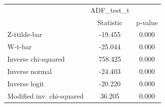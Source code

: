 \begin{tabular}{l*{2}{c}}
\hline\hline
            &  ADF\_test\_t&            \\
            &   Statistic&     p-value\\
\hline
Z-ttilde-bar&     -19.455&       0.000\\
W-t-bar     &     -25.044&       0.000\\
Inverse chi-squared&     758.425&       0.000\\
Inverse normal&     -24.403&       0.000\\
Inverse logit&     -20.220&       0.000\\
Modified inv. chi-squared&      36.205&       0.000\\
\hline\hline
\end{tabular}
